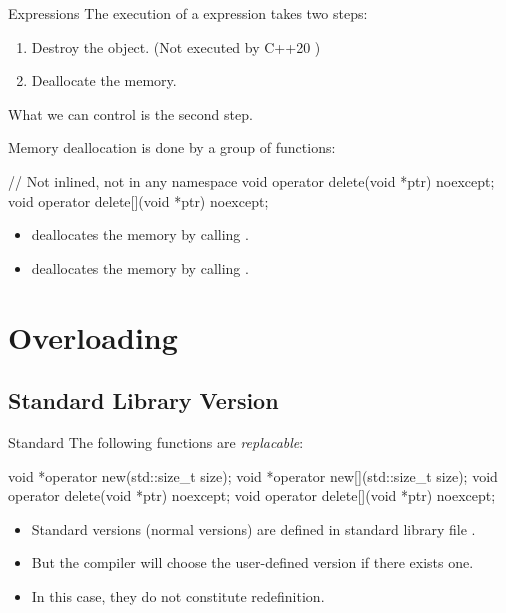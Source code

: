 \documentclass{beamer}
\begin{document}
\begin{frame}{ Expressions}
  The execution of a  expression takes two steps:
  \begin{enumerate}
      \item Destroy the object. {\small(Not executed by C++20 )}
    \item Deallocate the memory.
  \end{enumerate}
  What we can control is the second step.
\end{frame}

\begin{frame}[fragile]{}
  Memory deallocation is done by a group of functions:
  \begin{cpp}
// Not inlined, not in any namespace
void operator delete(void *ptr) noexcept;
void operator delete[](void *ptr) noexcept;
  \end{cpp}
  \begin{itemize}
    \item {} deallocates the memory by calling .
    \item {} deallocates the memory by calling .
  \end{itemize}
\end{frame}

\section{Overloading }

\subsection{Standard Library Version}

\begin{frame}[fragile]{Standard }
  The following functions are \textit{replacable}:
  \begin{cpp}
void *operator new(std::size_t size);
void *operator new[](std::size_t size);
void operator delete(void *ptr) noexcept;
void operator delete[](void *ptr) noexcept;
  \end{cpp}
  \begin{itemize}
    \item Standard versions (normal versions) are defined in standard library file .
    \item But the compiler will choose the user-defined version if there exists one.
    \item In this case, they do not constitute redefinition.
  \end{itemize}
\end{frame}
\end{document}
